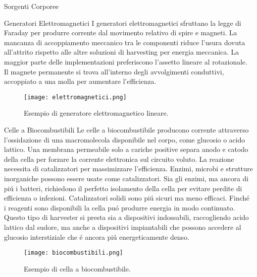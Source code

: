 \begin{section}{Sorgenti Corporee}
   \begin{subsection}{Generatori Elettromagnetici}
    I generatori elettromagnetici sfruttano la legge di Faraday per produrre corrente dal movimento relativo di spire e magneti. La mancanza di accoppiamento meccanico tra le componenti riduce l'usura dovuta all'attrito rispetto alle altre soluzioni di harvesting per energia meccanica. La maggior parte delle implementazioni preferiscono l'assetto lineare al rotazionale. Il magnete permanente si trova all'interno degli avvolgimenti conduttivi, accoppiato a una molla per aumentare l'efficienza.
    \begin{figure}[H]
        \texttt{[image: elettromagnetici.png]}
        \centering
        \caption{Esempio di generatore elettromagnetico lineare.}
        \label{fig:elettromagnetici}
    \end{figure}
   \end{subsection}
   
   \begin{subsection}{Celle a Biocombustibili}
    Le celle a biocombustibile producono corrente attraverso l'ossidazione di una macromolecola disponibile nel corpo, come glucosio o acido lattico. Una membrana permeabile solo a cariche positive separa anodo e catodo della cella per forzare la corrente elettronica sul circuito voluto. La reazione necessita di catalizzatori per massimizzare l'efficienza. Enzimi, microbi e strutture inorganiche possono essere usate come catalizzatori. Sia gli enzimi, ma ancora di pi\'u i batteri, richiedono il perfetto isolamento della cella per evitare perdite di efficienza o infezioni. Catalizzatori solidi sono pi\'u sicuri ma meno efficaci. Finch\'e i reagenti sono disponibili la cella pu\'o produrre energia in modo continuato. Questo tipo di harvester si presta sia a dispositivi indossabili, raccogliendo acido lattico dal sudore, ma anche a dispositivi impiantabili che possono accedere al glucosio interstiziale che \'e ancora pi\'u energeticamente denso. 
    \begin{figure}[H]
        \texttt{[image: biocombustibili.png]}
        \centering
        \caption{Esempio di cella a biocombustibile.}
        \label{fig:biocombustibili}
    \end{figure}
   \end{subsection}
\end{section}


